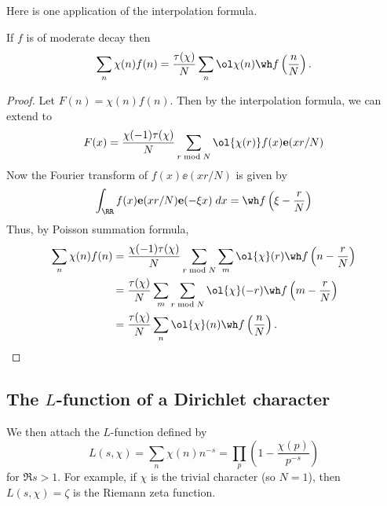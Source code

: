 Here is one application of the interpolation formula.
\begin{corollary}
  If $f$ is of moderate decay then
  \[ \sum_n \chi(n) f(n) =
    \frac{\tau(\chi)}{N}
    \sum_n \ol \chi (n) \wh f\left( \frac nN \right).  \]
\end{corollary}
\begin{proof}
  Let $F(n) = \chi(n) f(n)$.
  Then by the interpolation formula, we can extend to
  \[ F(x) = \frac{\chi(-1)\tau(\chi)}{N}
    \sum_{r \bmod N} \ol{\chi(r)} f(x) \ee(xr/N) \]
  Now the Fourier transform of $f(x) \ee(xr/N)$
  is given by
  \[ \int_\RR f(x) \ee(x r /N)
    \ee(-\xi x) \; dx
    = \wh f \left( \xi - \frac rN \right) \]
  Thus, by Poisson summation formula,
  \begin{align*}
    \sum_n \chi(n) f(n) &= \frac{\chi(-1)\tau(\chi)}{N}
      \sum_{r \bmod N} \sum_m \ol{\chi}(r)
      \wh f\left( n - \frac r N \right) \\
    &= \frac{\tau(\chi)}{N}
      \sum_m \sum_{r \bmod N} \ol{\chi}(-r)
      \wh f\left( m - \frac r N \right) \\
    &= \frac{\tau(\chi)}{N} \sum_n \ol{\chi}(n)
      \wh f\left( \frac nN \right). \qedhere
  \end{align*}
\end{proof}

\subsection{The $L$-function of a Dirichlet character}
We then attach the $L$-function defined by
\[
  L(s, \chi) = \sum_n \chi(n) n^{-s}
  = \prod_p \left( 1 - \frac{\chi(p)}{p^{-s}} \right)
\]
for $\Re s > 1$.
For example, if $\chi$ is the trivial character (so $N=1$),
then $L(s,\chi) = \zeta$ is the Riemann zeta function.

